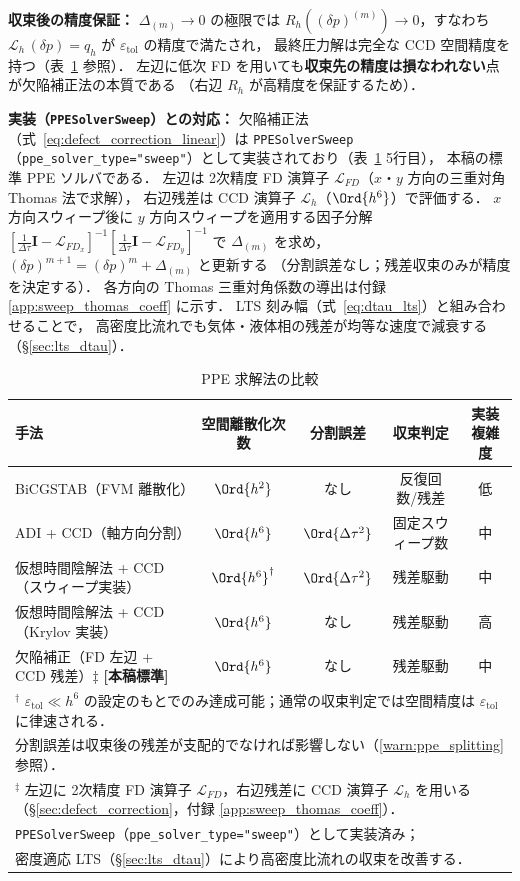 \textbf{収束後の精度保証：}
$\Delta_{(m)} \to 0$ の極限では $R_h((\delta p)^{(m)}) \to 0$，すなわち
$\mathcal{L}_h\,(\delta p) = q_h$ が $\varepsilon_\mathrm{tol}$ の精度で満たされ，
最終圧力解は完全な CCD 空間精度を持つ（表~\ref{tab:ppe_methods} 参照）．
左辺に低次 FD を用いても\textbf{収束先の精度は損なわれない}点が欠陥補正法の本質である
（右辺 $R_h$ が高精度を保証するため）．

\textbf{実装（\texttt{PPESolverSweep}）との対応：}
欠陥補正法（式~\eqref{eq:defect_correction_linear}）は
\texttt{PPESolverSweep}（\texttt{ppe\_solver\_type="sweep"}）として実装されており（表~\ref{tab:ppe_methods} 5行目），
本稿の標準 PPE ソルバである．
左辺は 2次精度 FD 演算子 $\mathcal{L}_{FD}$（$x$・$y$ 方向の三重対角 Thomas 法で求解），
右辺残差は CCD 演算子 $\mathcal{L}_h$（$\Ord{h^6}$）で評価する．
$x$ 方向スウィープ後に $y$ 方向スウィープを適用する因子分解
$[\frac{1}{\Delta\tau}\mathbf{I} - \mathcal{L}_{FD_x}]^{-1}[\frac{1}{\Delta\tau}\mathbf{I} - \mathcal{L}_{FD_y}]^{-1}$
で $\Delta_{(m)}$ を求め，$(\delta p)^{m+1} = (\delta p)^{m} + \Delta_{(m)}$ と更新する
（分割誤差なし；残差収束のみが精度を決定する）．
各方向の Thomas 三重対角係数の導出は付録 \ref{app:sweep_thomas_coeff} に示す．
LTS 刻み幅（式~\eqref{eq:dtau_lts}）と組み合わせることで，
高密度比流れでも気体・液体相の残差が均等な速度で減衰する（§\ref{sec:lts_dtau}）．

\begin{table}[ht]
\centering
\small
\caption{PPE 求解法の比較}
\label{tab:ppe_methods}
\begin{tabular}{lcccc}
\hline
手法 & 空間離散化次数 & 分割誤差 & 収束判定 & 実装複雑度 \\
\hline
BiCGSTAB（FVM 離散化） & $\Ord{h^2}$ & なし & 反復回数/残差 & 低 \\
ADI + CCD（軸方向分割） & $\Ord{h^6}$ & $\Ord{\Delta\tau^2}$ & 固定スウィープ数 & 中 \\
仮想時間陰解法 + CCD（スウィープ実装）& $\Ord{h^6}^{\dagger}$ & $\Ord{\Delta\tau^2}$ & 残差駆動 & 中 \\
仮想時間陰解法 + CCD（Krylov 実装） & $\Ord{h^6}$ & なし & 残差駆動 & 高 \\
欠陥補正（FD 左辺 + CCD 残差）$\ddagger$ \textbf{[本稿標準]} & $\Ord{h^6}$ & なし & 残差駆動 & 中 \\
\hline
\multicolumn{5}{l}{$^{\dagger}$ $\varepsilon_\mathrm{tol} \ll h^6$ の設定のもとでのみ達成可能；通常の収束判定では空間精度は $\varepsilon_\mathrm{tol}$ に律速される．}\\
\multicolumn{5}{l}{\phantom{$^{\dagger}$} 分割誤差は収束後の残差が支配的でなければ影響しない（\ref{warn:ppe_splitting} 参照）．}\\
\multicolumn{5}{l}{$^{\ddagger}$ 左辺に 2次精度 FD 演算子 $\mathcal{L}_{FD}$，右辺残差に CCD 演算子 $\mathcal{L}_h$ を用いる（§\ref{sec:defect_correction}，付録 \ref{app:sweep_thomas_coeff}）．}\\
\multicolumn{5}{l}{\phantom{$^{\ddagger}$} \texttt{PPESolverSweep}（\texttt{ppe\_solver\_type="sweep"}）として実装済み；}\\
\multicolumn{5}{l}{\phantom{$^{\ddagger}$} 密度適応 LTS（§\ref{sec:lts_dtau}）により高密度比流れの収束を改善する．}
\end{tabular}
\end{table}

